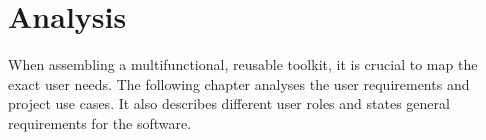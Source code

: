 \chapter{Analysis} \label{analysis}

When assembling a multifunctional, reusable toolkit, it is crucial to map the exact user needs.
The following chapter analyses the user requirements and project use cases. 
It also describes different user roles and states general requirements for the software.












